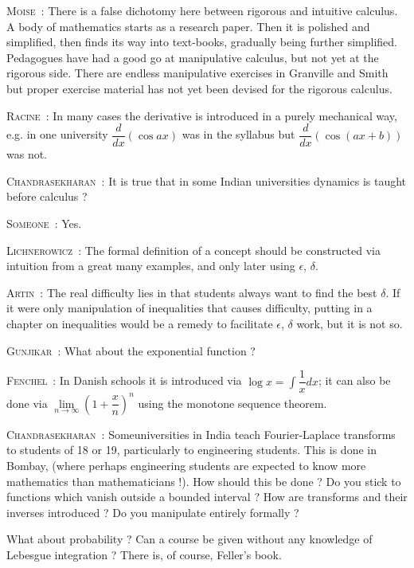 \smallskip
\noindent
\textsc{Moise}~: There is a false dichotomy here between rigorous and intuitive calculus. A body of mathematics starts as a research paper. Then it is polished and simplified, then finds its way into text-books, gradually being further simplified. Pedagogues have had a good go at manipulative calculus, but not yet at the rigorous side. There are endless manipulative exercises in Granville and Smith but proper exercise material has not yet been devised for the rigorous calculus.

\smallskip
\noindent
\textsc{Racine}~: In many cases the derivative is introduced in a purely mechanical way, e.g. in one university $\dfrac{d}{dx}(\cos ax)$ was in the syllabus but $\dfrac{d}{dx}(\cos (ax+b))$ was not.

\smallskip
\noindent
\textsc{Chandrasekharan}~: It is true that in some Indian universities dynamics is taught before calculus ?

\smallskip
\noindent
\textsc{Someone}~: Yes.

\smallskip
\noindent
\textsc{Lichnerowicz}~: The formal definition of a concept should be constructed via intuition from a great many examples, and only later using $\epsilon$, $\delta$.

\smallskip
\noindent
\textsc{Artin}~: The real difficulty lies in that students always want to find the best $\delta$. If it were only manipulation of inequalities that causes difficulty, putting in a chapter on inequalities would be a remedy to facilitate $\epsilon$, $\delta$ work, but it is not so.

\smallskip
\noindent
\textsc{Gunjikar}~: What about the exponential function ?

\smallskip
\noindent
\textsc{Fenchel}~: In Danish schools it is introduced via $\log x=\int \dfrac{1}{x}dx$; it can also be done via $\lim\limits_{n\to \infty}\left(1+\dfrac{x}{n}\right)^{n}$ using the monotone sequence theorem.

\smallskip
\noindent
\textsc{Chandrasekharan}~: Some\pageoriginale universities in India teach Fourier-Laplace transforms to students of 18 or 19, particularly to engineering students. This is done in Bombay, (where perhaps engineering students are expected to know more mathematics than mathematicians !). How should this be done ? Do you stick to functions which vanish outside a bounded interval ? How are transforms and their inverses introduced ? Do you manipulate entirely formally ?

What about probability ? Can a course be given without any knowledge of Lebesgue integration ? There is, of course, Feller's book.

